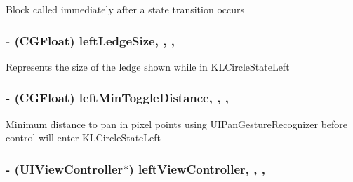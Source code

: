 Block called immediately after a state transition occurs \hypertarget{interface_k_l_circle_view_controller_af0b91974b3c8a36b53d7e295b226e9db}{
\subsubsection[{left\-Ledge\-Size}]{\setlength{\rightskip}{0pt plus 5cm}-\/ (C\-G\-Float) left\-Ledge\-Size\hspace{0.3cm}{\ttfamily [read]}, {\ttfamily [write]}, {\ttfamily [nonatomic]}, {\ttfamily [assign]}}}\label{interface_k_l_circle_view_controller_af0b91974b3c8a36b53d7e295b226e9db}
Represents the size of the ledge shown while in K\-L\-Circle\-State\-Left \hypertarget{interface_k_l_circle_view_controller_a4d4c3965dc85bb995db031ea1edacc6a}{
\subsubsection[{left\-Min\-Toggle\-Distance}]{\setlength{\rightskip}{0pt plus 5cm}-\/ (C\-G\-Float) left\-Min\-Toggle\-Distance\hspace{0.3cm}{\ttfamily [read]}, {\ttfamily [write]}, {\ttfamily [nonatomic]}, {\ttfamily [assign]}}}\label{interface_k_l_circle_view_controller_a4d4c3965dc85bb995db031ea1edacc6a}
Minimum distance to pan in pixel points using U\-I\-Pan\-Gesture\-Recognizer before control will enter K\-L\-Circle\-State\-Left \hypertarget{interface_k_l_circle_view_controller_a659f3c61b551e9c4693bae2453822274}{
\subsubsection[{left\-View\-Controller}]{\setlength{\rightskip}{0pt plus 5cm}-\/ (U\-I\-View\-Controller$\ast$) left\-View\-Controller\hspace{0.3cm}{\ttfamily [read]}, {\ttfamily [write]}, {\ttfamily [nonatomic]}, {\ttfamily [strong]}}}\label{interface_k_l_circle_view_controller_a659f3c61b551e9c4693bae2453822274}
